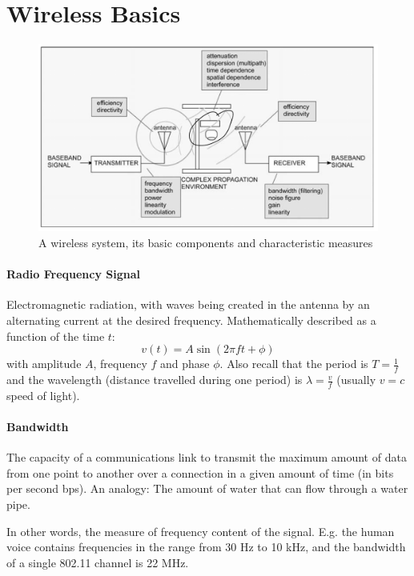 \section{Wireless Basics}

\begin{figure}[h]
	\centering
	\includegraphics[scale=0.4]{images/1-wireless-system.png}
	\caption{A wireless system, its basic components and characteristic measures}
	\label{fig:wireless-system}
\end{figure}

\paragraph{Radio Frequency Signal}
Electromagnetic radiation, with waves being created in the antenna by an alternating current at the desired frequency.
Mathematically described as a function of the time $t$:
$$ v(t) = A \sin (2 \pi f t + \phi) $$
with amplitude $A$, frequency $f$ and phase $\phi$.
Also recall that the period is $T = \frac{1}{f}$ and the wavelength (distance travelled during one period) is $\lambda = \frac{v}{f}$ (usually $v=c$ speed of light).

\paragraph{Bandwidth}
The capacity of a communications link to transmit the maximum amount of data from one point to another over a connection in a given amount of time (in bits per second bps).
An analogy: The amount of water that can flow through a water pipe.

In other words, the measure of frequency content of the signal.
E.g. the human voice contains frequencies in the range from 30 Hz to 10 kHz, and the bandwidth of a single 802.11 channel is 22 MHz.

